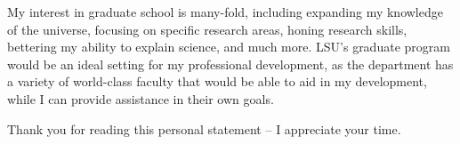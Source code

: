 \documentclass[12pt,letterpaper]{article}
\begin{document}
My interest in graduate school is many-fold, including expanding my knowledge of the universe, focusing on specific research areas, honing research skills, bettering my ability to explain science, and much more. LSU's graduate program would be an ideal setting for my professional development, as the department has a variety of world-class faculty that would be able to aid in my development, while I can provide assistance in their own goals. 

Thank you for reading this personal statement -- I appreciate your time.
\end{document}
